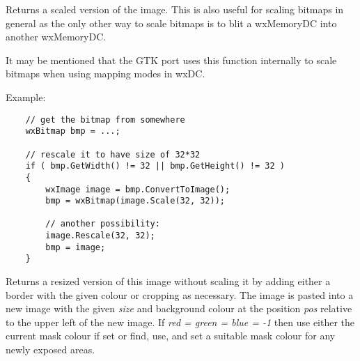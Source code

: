 

\label{wximagescale}


Returns a scaled version of the image. This is also useful for
scaling bitmaps in general as the only other way to scale bitmaps
is to blit a wxMemoryDC into another wxMemoryDC.

It may be mentioned that the GTK port uses this function internally
to scale bitmaps when using mapping modes in wxDC. 

Example:

\begin{verbatim}
    // get the bitmap from somewhere
    wxBitmap bmp = ...;

    // rescale it to have size of 32*32
    if ( bmp.GetWidth() != 32 || bmp.GetHeight() != 32 )
    {
        wxImage image = bmp.ConvertToImage();
        bmp = wxBitmap(image.Scale(32, 32));

        // another possibility:
        image.Rescale(32, 32);
        bmp = image;
    }

\end{verbatim}




\label{wximagesize}


Returns a resized version of this image without scaling it by adding either a border 
with the given colour or cropping as necessary. The image is pasted into a new 
image with the given {\it size} and background colour at the position {\it pos} 
relative to the upper left of the new image. If {\it red = green = blue = -1} 
then use either the current mask colour if set or find, use, and set a 
suitable mask colour for any newly exposed areas.


